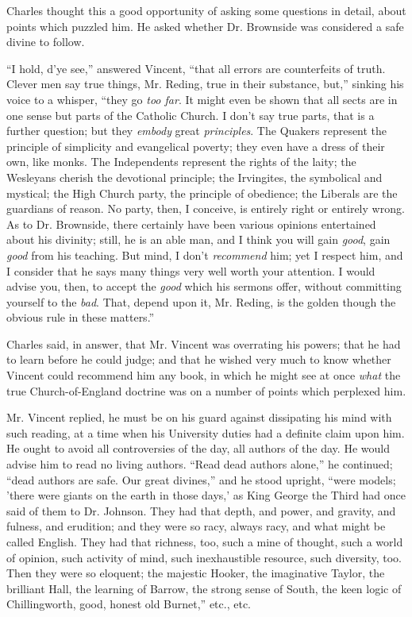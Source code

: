 Charles thought this a good opportunity of asking some questions in
detail, about points which puzzled him. He asked whether Dr. Brownside
was considered a safe divine to follow.

``I hold, d'ye see,'' answered Vincent, ``that all
errors are counterfeits of truth. Clever men say true things, Mr.
Reding, true in their substance, but,'' sinking his voice to a
whisper, ``they go \emph{too far}. It might even be shown
that all sects are in one sense but parts of the Catholic Church. I
don't say true parts, that is a further question; but they \emph{embody}
great \emph{principles}. The Quakers represent the principle of
simplicity and evangelical poverty; they even have a dress of their
own, like monks. The Independents represent the rights of the laity;
the Wesleyans cherish the devotional principle; the Irvingites, the
symbolical and mystical; the High Church party, the principle of
obedience; the Liberals are the guardians of reason. No party, then, I
conceive, is entirely right or entirely wrong. As to Dr. Brownside,
there certainly have been various opinions entertained about his
divinity; still, he is an able man, and I think you will gain \emph{good},
gain \emph{good} from his teaching. But mind, I don't \emph{recommend}
him; yet I respect him, and I consider that he says many things very
well worth your attention. I would advise you, then, to accept the \emph{good}
which his sermons offer, without committing yourself to the \emph{bad}.
That, depend upon it, Mr. Reding, is the golden though the obvious
rule in these matters.''

Charles said, in answer, that Mr. Vincent was overrating his
powers; that he had to learn before he could judge; and that he
wished very much to know whether Vincent could recommend him any book,
in which he might see at once \emph{what} the true Church-of-England
doctrine was on a number of points which perplexed him.

Mr. Vincent replied, he must be on his guard against dissipating
his mind with such reading, at a time when his University duties had a
definite claim upon him. He ought to avoid all controversies of
the day, all authors of the day. He would advise him to read no living
authors. ``Read dead authors alone,'' he continued; ``dead
authors are safe. Our great divines,'' and he stood upright,
``were models; 'there were giants on the earth in those days,' as
King George the Third had once said of them to Dr. Johnson. They had
that depth, and power, and gravity, and fulness, and erudition; and
they were so racy, always racy, and what might be called English. They
had that richness, too, such a mine of thought, such a world of
opinion, such activity of mind, such inexhaustible resource, such
diversity, too. Then they were so eloquent; the majestic Hooker, the
imaginative Taylor, the brilliant Hall, the learning of Barrow, the
strong sense of South, the keen logic of Chillingworth, good, honest
old Burnet,'' etc., etc.

